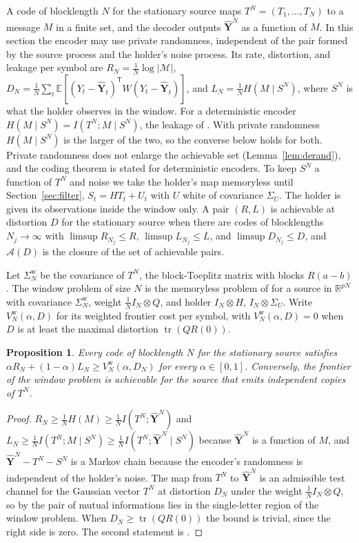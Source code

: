 \documentclass[11pt,onecolumn]{IEEEtran}
\newtheorem{proposition}[theorem]{Proposition}
\newcommand{\E}{\mathbb{E}}
\newcommand{\R}{\mathbb{R}}
\newcommand{\tr}{\operatorname{tr}}
\newcommand{\hY}{\hat{\mathbf Y}}
\begin{document}
A code of blocklength $N$ for the stationary source maps
$T^N=(T_1,\dots,T_N)$ to a message $M$ in a finite set, and the decoder
outputs $\hY^N$ as a function of $M$. In this section the encoder may
use private randomness, independent of the pair formed by the source
process and the holder's noise process. Its rate, distortion, and leakage per symbol are
$R_N=\tfrac1N\log|\mathcal M|$,
$D_N=\tfrac1N\sum_t\E[(Y_t-\hY_t)^{\mathsf T}W(Y_t-\hY_t)]$, and
$L_N=\tfrac1NH(M\mid S^N)$, where $S^N$ is what the holder observes
in the window. For a deterministic encoder
$H(M\mid S^N)=I(T^N;M\mid S^N)$, the leakage of \cite{part1}. With
private randomness $H(M\mid S^N)$ is the larger of the two, so the
converse below holds for both. Private randomness does not enlarge the
achievable set (Lemma~\ref{lem:derand}), and the coding theorem is
stated for deterministic encoders. To
keep $S^N$ a function of $T^N$ and noise we take the
holder's map memoryless until Section~\ref{sec:filter}, $S_t=HT_t+U_t$ with $U$ white of
covariance $\Sigma_U$. The holder is given its observations inside the
window only. A pair $(R,L)$ is achievable at distortion $D$ for the
stationary source when there are codes of blocklengths $N_j\to\infty$
with $\limsup R_{N_j}\le R$, $\limsup L_{N_j}\le L$, and
$\limsup D_{N_j}\le D$, and $\mathcal A(D)$ is the closure of the set of
achievable pairs.

Let $\Sigma^{\mathrm w}_N$ be the covariance of $T^N$, the block-Toeplitz
matrix with blocks $R(a-b)$. The window problem of size $N$ is the
memoryless problem of \cite{part1} for a source in $\R^{pN}$ with
covariance $\Sigma^{\mathrm w}_N$, weight $\tfrac1NI_N\otimes Q$, and
holder $I_N\otimes H$, $I_N\otimes\Sigma_U$. Write
$V^{\mathrm w}_N(\alpha,D)$ for its weighted frontier cost per symbol,
with $V^{\mathrm w}_N(\alpha,D)=0$ when $D$ is at least the maximal
distortion $\tr(QR(0))$.

\begin{proposition}\label{prop:window}
Every code of blocklength $N$ for the stationary source satisfies
$\alpha R_N+(1-\alpha)L_N\ge V^{\mathrm w}_N(\alpha,D_N)$ for every
$\alpha\in[0,1]$. Conversely, the frontier of the window problem is
achievable for the source that emits independent copies of $T^N$.
\end{proposition}

\begin{proof}
$R_N\ge\tfrac1NH(M)\ge\tfrac1NI(T^N;\hY^N)$ and
$L_N\ge\tfrac1NI(T^N;M\mid S^N)\ge\tfrac1NI(T^N;\hY^N\mid S^N)$ because
$\hY^N$ is a function of $M$, and $\hY^N-T^N-S^N$ is a Markov chain
because the encoder's randomness is independent of the holder's noise. The map from $T^N$ to $\hY^N$ is an
admissible test channel for the Gaussian vector $T^N$ at distortion
$D_N$ under the weight $\tfrac1NI_N\otimes Q$, so by \cite[Proposition~2]{part1} the pair of mutual
informations lies in the single-letter region of the window problem.
When $D_N\ge\tr(QR(0))$ the bound is trivial, since the right side is
zero. The second statement is \cite[Theorem~3]{part1}.
\end{proof}
\end{document}
